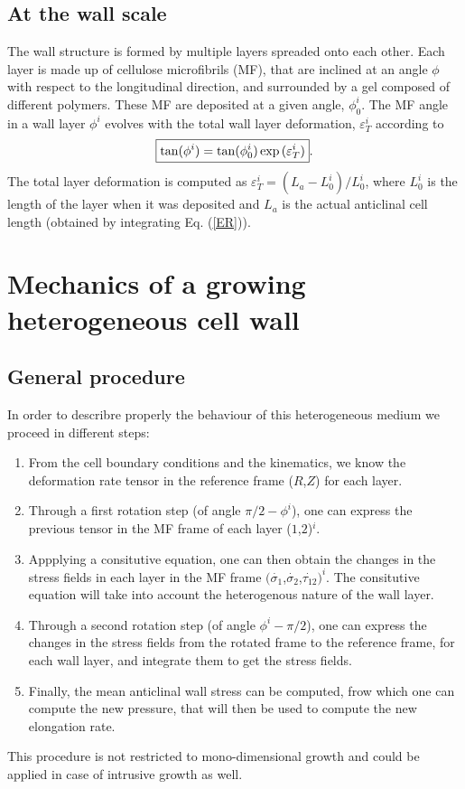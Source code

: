 \documentclass[]{article}
\begin{document}
\subsection{At the wall scale}
The wall structure is formed by multiple layers spreaded onto each other. Each layer is made up of cellulose microfibrils (MF), that are inclined at an angle $\phi$ with respect to the longitudinal direction, and surrounded by a gel composed of different polymers. These MF are deposited at a given angle, $\phi_0^i$. The MF angle in a wall layer $\phi^i$ evolves with the total wall layer deformation, $\varepsilon_T^i$ according to
\begin{equation}
	\boxed{
	{\rm tan}(\phi^i) = {\rm tan}(\phi_0^i)\exp{(\varepsilon_T^i)}}.
\end{equation}
The total layer deformation is computed as $\varepsilon_T^i=(L_a-L_0^i)/L_0^i$, where $L_0^i$ is the length of the layer when it was deposited and $L_a$ is the actual anticlinal cell length (obtained by integrating Eq. (\ref{ER})).

\section{Mechanics of a growing heterogeneous cell wall}
\subsection{General procedure}
In order to describre properly the behaviour of this heterogeneous medium we proceed in different steps:
\begin{enumerate}
	\item From the cell boundary conditions and the kinematics, we know the deformation rate tensor in the reference frame ($R$,$Z$) for each layer.
	\item Through a first rotation step (of angle $\pi/2-\phi^i$), one can express the previous tensor in the MF frame of each layer ($1$,$2$)$^i$.
	\item Appplying a consitutive equation, one can then obtain the changes in the stress fields in each layer in the MF frame $(\dot{\sigma_1}$,$\dot{\sigma_2}$,$\dot{\tau_{12}})^i$. The consitutive equation will take into account the heterogenous nature of the wall layer.
	\item Through  a second rotation step (of angle $\phi^i-\pi/2$), one can express the changes in the stress fields from the rotated frame to the reference frame, for each wall layer, and integrate them to get the stress fields.
	\item Finally, the mean anticlinal wall stress can be computed, frow which one can compute the new pressure, that will then be used to compute the new elongation rate.
\end{enumerate}
This procedure is not restricted to mono-dimensional growth and could be applied in case of intrusive growth as well.
\end{document}
